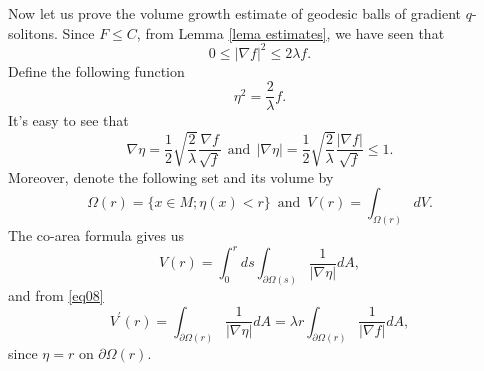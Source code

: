 \documentclass{amsart}
\theoremstyle{plain}
\numberwithin{equation}{section}
\begin{document}
Now let us prove the volume growth estimate of geodesic balls of gradient $q$-solitons. Since $F\leq C$, from Lemma \ref{lema estimates}, we have seen that
$$0\leq|\nabla f|^2\leq 2\lambda f. $$
Define the following function
\begin{equation*}
    \eta^2=\frac{2}{\lambda}f.
\end{equation*}
 It's easy to see that
\begin{equation}\label{eq08}
\nabla \eta=\frac{1}{2}\sqrt{\frac{2}{\lambda}}\frac{\nabla f}{\sqrt{f}}  \ \ \text{and} \ \ |\nabla \eta|= \frac{1}{2}\sqrt{\frac{2}{\lambda}}\frac{|\nabla f|}{\sqrt{f}}\leq 1.
\end{equation}
Moreover, denote the following set and its volume by
$$\Omega(r)=\{x\in M; \eta(x)<r\}\,\,\,{\text{and}}\,\,\,V(r)=\int_{\Omega(r)}dV.$$
The co-area formula gives us
$$V(r)=\int_{0}^{r}ds\int_{\partial \Omega(s)}\frac{1}{|\nabla \eta|}dA,$$
and from \eqref{eq08}
\begin{equation}\label{eq09}
    V^{\prime}(r)=\int_{\partial \Omega(r)}\frac{1}{|\nabla \eta|} dA= \lambda r\int_{\partial \Omega(r)} \frac{1}{|\nabla f|}dA,
\end{equation}
since $\eta=r$ on $\partial\Omega(r)$.
\end{document}

